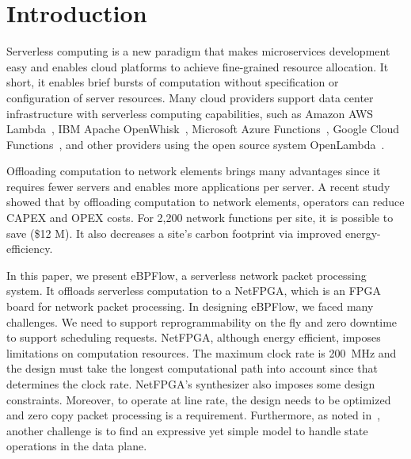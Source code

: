 \section{Introduction}
\label{sec:intro}


Serverless computing is a new paradigm that makes microservices development easy and enables cloud platforms to achieve fine-grained resource allocation.
It short, it enables brief bursts of computation without specification or configuration of server resources.
Many cloud providers support data center infrastructure with serverless computing capabilities, such as Amazon AWS Lambda~\cite{AWSLambda2017}, IBM Apache OpenWhisk~\cite{ApacheOpenWhisk}, Microsoft Azure Functions~\cite{AzureFunctions}, Google Cloud Functions~\cite{GoogleCloudFunctions}, and other providers using the open source system OpenLambda~\cite{OpenLambda2016}.


Offloading computation to network elements brings many advantages since it requires fewer servers and enables more applications per server. A recent study~\cite{powersmartnics} showed that by offloading computation to network elements, operators can reduce CAPEX and OPEX costs. For 2,200 network functions per site, it is possible to save (\$12 M). It also decreases a site's carbon footprint via improved energy-efficiency.


In this paper, we present eBPFlow, a serverless network packet processing system. It offloads serverless computation to a NetFPGA, which is an FPGA board for network packet processing.
In designing eBPFlow, we faced many challenges.
We need to support reprogrammability on the fly and zero downtime to support scheduling requests.
NetFPGA, although energy efficient, imposes limitations on computation resources. The maximum clock rate is 200~MHz and the design must take the longest computational path into account since that determines the clock rate. 
NetFPGA's synthesizer also imposes some design constraints. 
Moreover, to operate at line rate, the design needs to be optimized and zero copy packet processing is a requirement.
Furthermore, as noted in~\cite{bifulco2018survey}, another challenge is to find an expressive yet simple model to handle state operations in the data plane.

